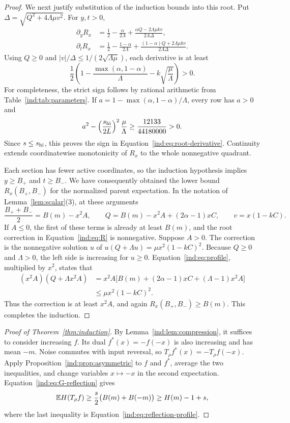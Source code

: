 \begin{proof}
We next justify substitution of the induction bounds into this root.
Put $\Delta=\sqrt{Q^2+4\Lambda\mu v^2}$.  For $y,t>0$,
\[
 \begin{split}
 \partial_yR_x
 &=\frac12-\frac{\alpha}{2\Lambda}
    +\frac{\alpha Q-2\Lambda\mu kv}{2\Lambda\Delta},\\
 \partial_tR_x
 &=\frac12-\frac{1-\alpha}{2\Lambda}
    +\frac{(1-\alpha)Q+2\Lambda\mu kv}{2\Lambda\Delta}.
 \end{split}
\]
Using $Q\ge0$ and
$|v|/\Delta\le1/(2\sqrt{\Lambda\mu})$, each derivative is at least
\begin{equation}\label{ind:eq:root-derivative}
 \frac12\left(1-\frac{\max(\alpha,1-\alpha)}{\Lambda}
              -k\sqrt{\frac\mu\Lambda}\right)>0.
\end{equation}
For completeness, the strict sign follows by rational arithmetic from
Table~\ref{ind:tab:parameters}.  If
$a=1-\max(\alpha,1-\alpha)/\Lambda$, every row has $a>0$ and
\[
 a^2-\left(\frac{s_{\rm hi}}{2L}\right)^2\frac\mu\Lambda
 \ge\frac{12133}{44180000}>0.
\]
Since $s\le s_{\rm hi}$, this proves the sign in
Equation~\eqref{ind:eq:root-derivative}.  Continuity extends
coordinatewise monotonicity of $R_x$ to the whole nonnegative quadrant.

Each section has fewer active coordinates, so the induction hypothesis
implies $y\ge B_+$ and $t\ge B_-$.  We have consequently obtained the
lower bound $R_x(B_+,B_-)$ for the normalized parent expectation.
In the notation of Lemma~\ref{lem:scalar}(3), at these arguments
\[
 \frac{B_++B_-}{2}=B(m)-x^2A,\qquad
 Q=B(m)-x^2A+(2\alpha-1)xC,\qquad
 v=x(1-kC).
\]
If $A\le0$, the first of these terms is already at least $B(m)$,
and the root correction in Equation~\eqref{ind:eq:R} is nonnegative.
Suppose $A>0$.  The correction is the nonnegative solution $u$ of
$u(Q+\Lambda u)=\mu x^2(1-kC)^2$.  Because $Q\ge0$ and $\Lambda>0$,
the left side is increasing for $u\ge0$.  Equation~\eqref{ind:eq:profile},
multiplied by $x^2$, states that
\[
 \begin{split}
 (x^2A)(Q+\Lambda x^2A)
 &=x^2A\bigl[B(m)+(2\alpha-1)xC+(\Lambda-1)x^2A\bigr]\\
 &\le\mu x^2(1-kC)^2.
 \end{split}
\]
Thus the correction is at least $x^2A$, and again
$R_x(B_+,B_-)\ge B(m)$.  This completes the induction.
\end{proof}

\begin{proof}[Proof of Theorem~\ref{thm:induction}]
By Lemma~\ref{ind:lem:compression}, it suffices to consider increasing
$f$.  Its dual $f^*(x)=-f(-x)$ is also increasing and has mean $-m$.
Noise commutes with input reversal, so
$T_\rho f^*(x)=-T_\rho f(-x)$.  Apply
Proposition~\ref{ind:prop:asymmetric} to $f$ and $f^*$, average the two
inequalities, and change variables $x\mapsto-x$ in the second
expectation.  Equation~\eqref{ind:eq:G-reflection} gives
\[
 \mathbb E H(T_\rho f)
 \ge\frac{s}{2}\bigl(B(m)+B(-m)\bigr)
 \ge H(m)-1+s,
\]
where the last inequality is Equation~\eqref{ind:eq:reflection-profile}.
\end{proof}
